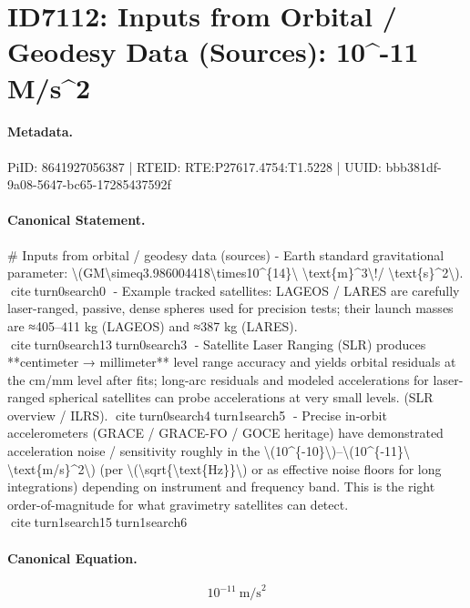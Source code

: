 \section*{ID7112: Inputs from Orbital / Geodesy Data (Sources): 10\textasciicircum{}-11 M/s\textasciicircum{}2}
\paragraph{Metadata.}
PiID: 8641927056387 | RTEID: RTE:P27617.4754:T1.5228 | UUID: bbb381df-9a08-5647-bc65-17285437592f

\paragraph{Canonical Statement.}
\# Inputs from orbital / geodesy data (sources) - Earth standard gravitational parameter: \textbackslash{}(GM\textbackslash{}simeq3.986004418\textbackslash{}times10\textasciicircum{}\{14\}\textbackslash{} \textbackslash{}text\{m\}\textasciicircum{}3\textbackslash{}!/ \textbackslash{}text\{s\}\textasciicircum{}2\textbackslash{}). citeturn0search0 - Example tracked satellites: LAGEOS / LARES are carefully laser-ranged, passive, dense spheres used for precision tests; their launch masses are ≈405–411 kg (LAGEOS) and ≈387 kg (LARES). citeturn0search13turn0search3 - Satellite Laser Ranging (SLR) produces **centimeter → millimeter** level range accuracy and yields orbital residuals at the cm/mm level after fits; long-arc residuals and modeled accelerations for laser-ranged spherical satellites can probe accelerations at very small levels. (SLR overview / ILRS). citeturn0search4turn1search5 - Precise in-orbit accelerometers (GRACE / GRACE-FO / GOCE heritage) have demonstrated acceleration noise / sensitivity roughly in the \textbackslash{}(10\textasciicircum{}\{-10\}\textbackslash{})–\textbackslash{}(10\textasciicircum{}\{-11\}\textbackslash{} \textbackslash{}text\{m/s\}\textasciicircum{}2\textbackslash{}) (per \textbackslash{}(\textbackslash{}sqrt\{\textbackslash{}text\{Hz\}\}\textbackslash{}) or as effective noise floors for long integrations) depending on instrument and frequency band. This is the right order-of-magnitude for what gravimetry satellites can detect. citeturn1search15turn1search6

\paragraph{Canonical Equation.}
\[
10^{-11}\ \text{m/s}^2
\]

